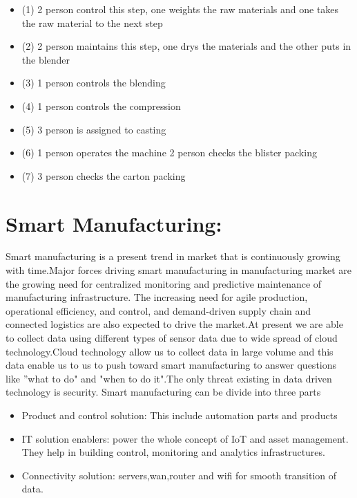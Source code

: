 \documentclass{article}
\begin{document}
\begin{normalsize}
\begin{tikzpicture}[node distance = 2cm]
        	
        
        
        \end{tikzpicture}
        
             \begin{itemize}
        
\item(1){ 2 person control this step, one weights the raw materials and one takes the raw material to the next step }
\item(2){ 2 person maintains this step, one drys the materials and the other puts in the blender
} 
\item(3){ 1 person controls the blending }
\item(4){ 1 person controls the compression}
\item(5){ 3 person is assigned to casting}
\item(6){ 1 person operates the machine 2 person checks the blister packing}
\item(7){ 3 person checks the carton packing}


        \end{itemize}
        
        
      
        	

 \section{Smart Manufacturing:}
       Smart manufacturing is a present trend in market that is continuously growing with time.Major forces driving smart manufacturing in manufacturing market are the growing need for centralized monitoring and predictive maintenance of manufacturing infrastructure. The increasing need for agile production, operational efficiency, and control, and demand-driven supply chain and connected logistics are also expected to drive the market.At present we are able to collect data using different types of sensor data due to wide spread of cloud technology.Cloud technology allow us to collect data in large volume and this data enable us to us to push toward smart manufacturing to answer questions like ''what to do" and "when to do it".The only threat existing in data driven technology is security.	Smart manufacturing can be divide into three parts
       
        	     \begin{itemize}
        
\item{Product and control solution: This include automation parts and products}
\item{IT solution enablers: power the whole concept of IoT and asset management. They help in building control, monitoring and analytics infrastructures.
} 
\item{Connectivity solution: servers,wan,router and wifi for smooth transition of data.}


\end{itemize}
\end{normalsize}
\end{document}
